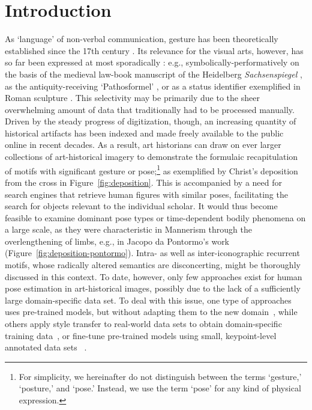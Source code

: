 \documentclass[sigconf]{acmart}
\begin{document}
\section{Introduction}
\label{sec:intro}

As \enquote*{language} of non-verbal communication, gesture has been theoretically established since the 17th century \cite{Knowlson1965}. 
Its relevance for the visual arts, however, has so far been expressed at most sporadically \cite{Barasch1987}: e.g., symbolically-performatively on the basis of the medieval law-book manuscript of the Heidelberg \textit{Sachsenspiegel} \cite{vonAmira1905}, as the antiquity-receiving \enquote*{Pathosformel} \cite{Warburg1905, Warburg1914}, or as a status identifier exemplified in Roman sculpture \cite{Brilliant1963}. 
This selectivity may be primarily due to the sheer overwhelming amount of data that traditionally had to be processed manually. 
Driven by the steady progress of digitization, though, an increasing quantity of historical artifacts has been indexed and made freely available to the public online in recent decades. 
As a result, art historians can draw on ever larger collections of art-historical imagery to demonstrate the formulaic recapitulation of motifs with significant gesture or pose;\footnote{For simplicity, we hereinafter do not distinguish between the terms \enquote*{gesture,} \enquote*{posture,} and \enquote*{pose.} Instead, we use the term \enquote*{pose} for any kind of physical expression.} as exemplified by Christ's deposition from the cross in Figure~\ref{fig:deposition}. 
This is accompanied by a need for search engines that retrieve human figures with similar poses, facilitating the search for objects relevant to the individual scholar. 
It would thus become feasible to examine dominant pose types or time-dependent bodily phenomena on a large scale, as they were characteristic in Mannerism through the overlengthening of limbs, e.g., in Jacopo da Pontormo's work (Figure~\ref{fig:deposition-pontormo}). 
Intra- as well as inter-iconographic recurrent motifs, whose radically altered semantics are disconcerting, might be thoroughly discussed in this context. 
To date, however, only few approaches exist for human pose estimation in art-historical images, possibly due to the lack of a sufficiently large domain-specific data set. To deal with this issue, one type of approaches uses pre-trained models, but without adapting them to the new domain~\cite{DBLP:conf/eccv/MadhuMKBMC20, DBLP:conf/icdar/JenicekC19}, while others apply style transfer to real-world data sets to obtain domain-specific training data~\cite{DBLP:journals/corr/abs-2012-05616}, or fine-tune pre-trained models using small, keypoint-level annotated data sets ~\cite{DBLP:journals/corr/abs-2012-05616}.
\end{document}
